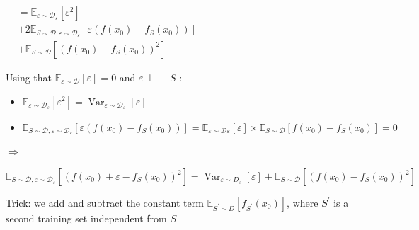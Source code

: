 $
\begin{aligned}
& =\mathbb{E}_{\varepsilon \sim \mathscr{D}_{\varepsilon}}\left[\varepsilon^{2}\right] \\
&+2 \mathbb{E}_{S \sim \mathscr{D}, \varepsilon \sim \mathscr{D}_{\varepsilon}}\left[\varepsilon\left(f\left(x_{0}\right)-f_{S}\left(x_{0}\right)\right)\right] \\
&+\mathbb{E}_{S \sim \mathscr{D}}\left[\left(f\left(x_{0}\right)-f_{S}\left(x_{0}\right)\right)^{2}\right]
\end{aligned}
$

Using that $\mathbb{E}_{\varepsilon \sim \mathscr{D}}[\varepsilon]=0$ and $\varepsilon \perp\perp S$ :

\begin{itemize}
  \item $\mathbb{E}_{\varepsilon \sim \mathscr{D}_{\varepsilon}}\left[\varepsilon^{2}\right]=\operatorname{Var}_{\varepsilon \sim \mathscr{D}_{\varepsilon}}[\varepsilon]$
  \item $\mathbb{E}_{S \sim \mathscr{D}, \varepsilon \sim \mathscr{D}_{\varepsilon}}\left[\varepsilon\left(f\left(x_{0}\right)-f_{S}\left(x_{0}\right)\right)\right]=\mathbb{E}_{\varepsilon \sim \mathscr{D} \varepsilon}[\varepsilon] \times \mathbb{E}_{S \sim \mathscr{D}}\left[f\left(x_{0}\right)-f_{S}\left(x_{0}\right)\right]=0$
\end{itemize}

$\Longrightarrow$

$\mathbb{E}_{S \sim \mathscr{D}, \varepsilon \sim \mathscr{D}_{\varepsilon}}\left[\left(f\left(x_{0}\right)+\varepsilon-f_{S}\left(x_{0}\right)\right)^{2}\right]=\operatorname{Var}_{\varepsilon \sim D_{\varepsilon}}[\varepsilon]+\mathbb{E}_{S \sim \mathscr{D}}\left[\left(f\left(x_{0}\right)-f_{S}\left(x_{0}\right)\right)^{2}\right]$

Trick: we add and subtract the constant term $\mathbb{E}_{S^{\prime} \sim D}\left[f_{S^{\prime}}\left(x_{0}\right)\right]$, where $S^{\prime}$ is a second training set independent from $S$



